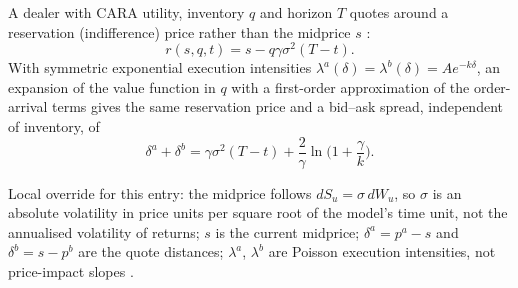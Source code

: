 \begin{qfmodel}\label{mod:avellaneda-stoikov}
 A dealer with CARA utility, inventory $q$ and horizon $T$ quotes around a reservation (indifference) price rather than the midprice $s$ \citep[sec.~2.2, eq.~(8), p.~219]{s6-stoikov}:
\[ r(s,q,t)=s-q\gamma\sigma^2(T-t). \]
With symmetric exponential execution intensities $\lambda^a(\delta)=\lambda^b(\delta)=Ae^{-k\delta}$, an expansion of the value function in $q$ with a first-order approximation of the order-arrival terms gives the same reservation price and a bid--ask spread, independent of inventory, of \citep[sec.~3.2, eqs.~(29)--(30), p.~221]{s6-stoikov}
\[ \delta^a+\delta^b=\gamma\sigma^2(T-t)+\frac{2}{\gamma}\ln\Big(1+\frac{\gamma}{k}\Big). \]

 Local override for this entry: the midprice follows $dS_u=\sigma\,dW_u$, so $\sigma$ is an absolute volatility in price units per square root of the model's time unit, not the annualised volatility of returns; $s$ is the current midprice; $\delta^a=p^a-s$ and $\delta^b=s-p^b$ are the quote distances; $\lambda^{a}$, $\lambda^{b}$ are Poisson execution intensities, not price-impact slopes \citep[secs.~2.1 and 2.4, pp.~218--219]{s6-stoikov}.


\end{qfmodel}
